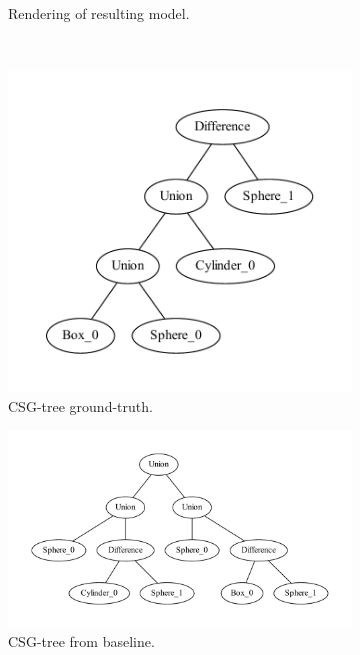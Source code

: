 \begin{figure}
\begin{subfigure}[b]{0.40\linewidth}
		\caption{Rendering of resulting model.}
	\end{subfigure}	 
	\\	
	\begin{subfigure}[b]{0.22\linewidth}
		\centering
		\includegraphics[width=\textwidth]{figures/tree_m1_gt.pdf}
		\caption{\ac{CSG}-tree ground-truth.}
	\end{subfigure}	 
	\begin{subfigure}[b]{0.38\linewidth}
		\centering
		\includegraphics[width=\textwidth]{figures/tree_m1_ga.pdf}
		\caption{\ac{CSG}-tree from baseline.}
	\end{subfigure}	 
	\begin{subfigure}[b]{0.38\linewidth}
		\centering

\end{subfigure}
\end{figure}

